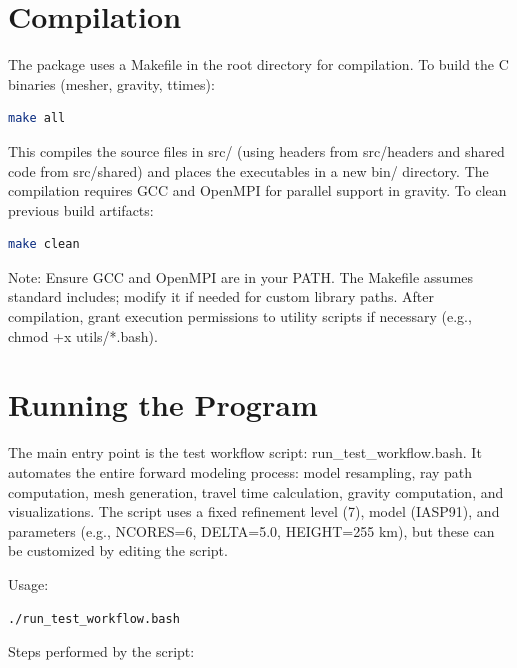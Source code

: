 \documentclass[12pt,a4paper]{article}
\begin{document}
\section{Compilation}
The package uses a Makefile in the root directory for compilation. To build the C binaries (mesher, gravity, ttimes):

\begin{lstlisting}[language=Bash]
make all
\end{lstlisting}

This compiles the source files in src/ (using headers from src/headers and shared code from src/shared) and places the executables in a new bin/ directory. The compilation requires GCC and OpenMPI for parallel support in gravity.
To clean previous build artifacts:

\begin{lstlisting}[language=Bash]
make clean
\end{lstlisting}
Note: Ensure GCC and OpenMPI are in your PATH. The Makefile assumes standard includes; modify it if needed for custom library paths. After compilation, grant execution permissions to utility scripts if necessary (e.g., chmod +x utils/*.bash).

\section{Running the Program}
The main entry point is the test workflow script: run\_test\_workflow.bash. It automates the entire forward modeling process: model resampling, ray path computation, mesh generation, travel time calculation, gravity computation, and visualizations. The script uses a fixed refinement level (7), model (IASP91), and parameters (e.g., NCORES=6, DELTA=5.0, HEIGHT=255 km), but these can be customized by editing the script.

Usage:

\begin{lstlisting}[language=Bash]
./run_test_workflow.bash
\end{lstlisting}

Steps performed by the script:
\end{document}
